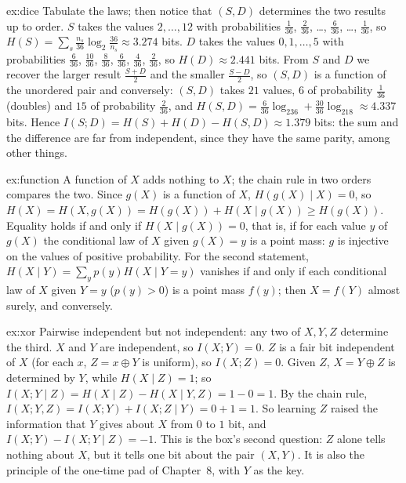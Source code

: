 \begin{solution}{ex:dice}
\idea Tabulate the laws; then notice that $(S,D)$ determines the two results up to order.
\writeup $S$ takes the values $2,\dots,12$ with probabilities $\frac1{36}$, $\frac2{36}$, \dots, $\frac6{36}$, \dots, $\frac1{36}$, so $H(S)=\sum_s\frac{n_s}{36}\log_2\frac{36}{n_s}\approx3.274$ bits. $D$ takes the values $0,1,\dots,5$ with probabilities $\frac6{36}$, $\frac{10}{36}$, $\frac8{36}$, $\frac6{36}$, $\frac4{36}$, $\frac2{36}$, so $H(D)\approx2.441$ bits. From $S$ and $D$ we recover the larger result $\frac{S+D}2$ and the smaller $\frac{S-D}2$, so $(S,D)$ is a function of the unordered pair and conversely: $(S,D)$ takes $21$ values, $6$ of probability $\frac1{36}$ (doubles) and $15$ of probability $\frac2{36}$, and $H(S,D)=\frac6{36}\log_236+\frac{30}{36}\log_218\approx4.337$ bits. Hence $I(S;D)=H(S)+H(D)-H(S,D)\approx1.379$ bits: the sum and the difference are far from independent, since they have the same parity, among other things.
\end{solution}

\begin{solution}{ex:function}
\idea A function of $X$ adds nothing to $X$; the chain rule in two orders compares the two.
\writeup Since $g(X)$ is a function of $X$, $H(g(X)\mid X)=0$, so $H(X)=H(X,g(X))=H(g(X))+H(X\mid g(X))\ge H(g(X))$. Equality holds if and only if $H(X\mid g(X))=0$, that is, if for each value $y$ of $g(X)$ the conditional law of $X$ given $g(X)=y$ is a point mass: $g$ is injective on the values of positive probability. For the second statement, $H(X\mid Y)=\sum_yp(y)H(X\mid Y=y)$ vanishes if and only if each conditional law of $X$ given $Y=y$ ($p(y)>0$) is a point mass $f(y)$; then $X=f(Y)$ almost surely, and conversely.
\end{solution}

\begin{solution}{ex:xor}
\idea Pairwise independent but not independent: any two of $X,Y,Z$ determine the third.
\writeup $X$ and $Y$ are independent, so $I(X;Y)=0$. $Z$ is a fair bit independent of $X$ (for each $x$, $Z=x\oplus Y$ is uniform), so $I(X;Z)=0$. Given $Z$, $X=Y\oplus Z$ is determined by $Y$, while $H(X\mid Z)=1$; so $I(X;Y\mid Z)=H(X\mid Z)-H(X\mid Y,Z)=1-0=1$. By the chain rule, $I(X;Y,Z)=I(X;Y)+I(X;Z\mid Y)=0+1=1$. So learning $Z$ raised the information that $Y$ gives about $X$ from $0$ to $1$ bit, and $I(X;Y)-I(X;Y\mid Z)=-1$. This is the box's second question: $Z$ alone tells nothing about $X$, but it tells one bit about the pair $(X,Y)$. It is also the principle of the one-time pad of Chapter~8, with $Y$ as the key.
\end{solution}

